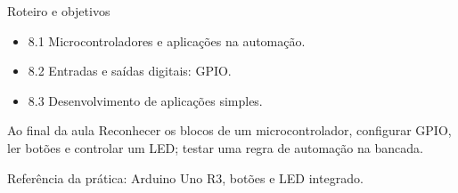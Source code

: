 \begin{frame}[t]{Roteiro e objetivos}
\begin{itemize}
\item 8.1 Microcontroladores e aplicações na automação.
\item 8.2 Entradas e saídas digitais: GPIO.
\item 8.3 Desenvolvimento de aplicações simples.
\end{itemize}
\begin{block}{Ao final da aula}
Reconhecer os blocos de um microcontrolador, configurar GPIO, ler botões e controlar um LED; testar uma regra de automação na bancada.
\end{block}
\small Referência da prática: Arduino Uno R3, botões e LED integrado.
\end{frame}
